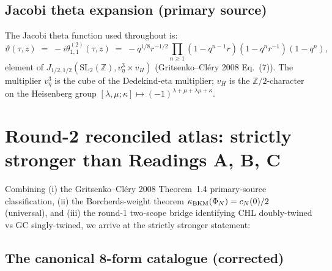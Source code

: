 \subsection*{Jacobi theta expansion (primary source)}

The Jacobi theta function used throughout is:
\begin{equation}
\label{eq:jacobi-theta-fourier-GC}
 \vartheta(\tau, z) \;=\; -i \theta_{1, 1}^{(2)}(\tau, z)
  \;=\; -q^{1/8} r^{-1/2} \prod_{n \geq 1}
    (1 - q^{n-1} r)(1 - q^n r^{-1})(1 - q^n),
\end{equation}
element of $J_{1/2, 1/2}(\mathrm{SL}_2(\mathbb{Z}), v_\eta^3 \times v_H)$
(Gritsenko--Cl\'ery 2008 Eq.~(7)). The multiplier $v_\eta^3$ is the cube
of the Dedekind-eta multiplier; $v_H$ is the $\mathbb{Z}/2$-character on
the Heisenberg group $[\lambda, \mu; \kappa] \mapsto
(-1)^{\lambda + \mu + \lambda\mu + \kappa}$.

\section*{Round-2 reconciled atlas: strictly stronger than Readings A, B, C}

Combining (i) the Gritsenko--Cl\'ery 2008 Theorem~1.4 primary-source
classification, (ii) the Borcherds-weight theorem
$\kappa_{\mathrm{BKM}}(\Phi_N) = c_N(0)/2$ (universal), and (iii) the round-1
two-scope bridge identifying CHL doubly-twined vs GC singly-twined, we
arrive at the strictly stronger statement:

\subsection*{The canonical 8-form catalogue (corrected)}

